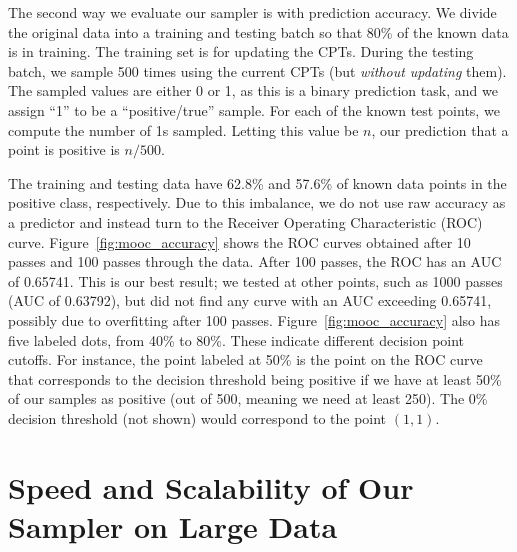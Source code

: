 \documentclass{article} %
\begin{document}
The second way we evaluate our sampler is with prediction accuracy. We divide the original
data into a training and testing batch so that 80\% of the known data is in training. The training
set is for updating the CPTs. During the testing batch, we sample 500 times using the current CPTs
(but \emph{without updating} them). The sampled values are either 0 or 1, as this is a binary
prediction task, and we assign ``1'' to be a ``positive/true'' sample. For each of the known test
points, we compute the number of 1s sampled. Letting this value be $n$, our prediction that a point
is positive is $n/500$.

The training and testing data have 62.8\% and 57.6\% of known data points in the positive class,
respectively. Due to this imbalance, we do not use raw accuracy as a predictor and instead turn to
the Receiver Operating Characteristic (ROC) curve. Figure~\ref{fig:mooc_accuracy} shows the ROC
curves obtained after 10 passes and 100 passes through the data. After 100 passes, the ROC has an
AUC of 0.65741. This is our best result; we tested at other points, such as 1000 passes (AUC of
0.63792), but did not find any curve with an AUC exceeding 0.65741, possibly due to overfitting
after 100 passes. Figure~\ref{fig:mooc_accuracy} also has five labeled dots, from 40\% to 80\%.
These indicate different decision point cutoffs. For instance, the point labeled at 50\% is the
point on the ROC curve that corresponds to the decision threshold being positive if we have at least
50\% of our samples as positive (out of 500, meaning we need at least 250). The 0\% decision
threshold (not shown) would correspond to the point $(1,1)$.



\section{Speed and Scalability of Our Sampler on Large Data}\label{sec:scaling_large_data}
\end{document}
